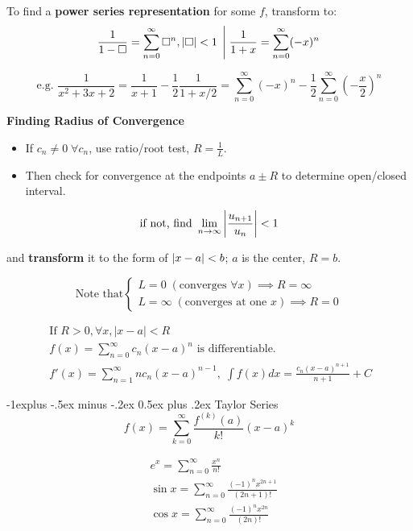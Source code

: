 \documentclass[10pt]{article}
\makeatletter
\renewcommand{\subsection}{\@startsection{subsection}{2}{0mm}%
                                {-1explus -.5ex minus -.2ex}%
                                {0.5ex plus .2ex}%
                                {\normalfont\normalsize\bfseries}}
\makeatother
\begin{document}
\begin{multicols}{2}
To find a \textbf{power series representation} for some $f$, transform to:
\[\frac{1}{1-\Box} = \sum_{n = 0 }^{\infty} \Box^n, \abs{\Box} < 1 \; \left\vert \; \frac{1}{1+x} = \sum_{n = 0 }^{\infty}(-x)^n \right. \]

\[\text{e.g. } \frac{1}{x^2+3x+2} = \frac{1}{x+1}-\frac{1}{2}\frac{1}{1+x/2} = 
\sum_{n = 0 }^{\infty}(-x)^n - \frac{1}{2} \sum_{n = 0 }^{\infty}(-\frac{x}{2})^n\]

\textbf{Finding Radius of Convergence} \\
\begin{itemize}
    \item If $c_n \neq 0 \; \forall c_n$, use ratio/root test, $R = \frac{1}{L}$.
    \item Then check for convergence at the endpoints $a\pm R$ to determine open/closed interval.
\end{itemize}

\[\text{if not, find }\lim_{n\to\infty} \abs{\frac{u_{n+1}}{u_n}} < 1\]

and \textbf{transform} it to the form of $\abs{x-a} < b$; $a$ is the center, $R = b$.

\[\text{Note that} \begin{cases}
    L = 0 \; (\text{converges } \forall x) \implies R = \infty \\
    L = \infty \; (\text{converges at one } x) \implies R = 0
\end{cases}\]

\begin{align*}
    & \text{If } R > 0, \forall x, |x-a| < R \\
    & f(x) = \sum_{n=0}^{\infty} c_n(x-a)^n \text{ is differentiable.} \\
    & f'(x) = \sum_{n=1}^{\infty} nc_n(x-a)^{n-1}, \; \int f(x)dx = \frac{c_n(x-a)^{n+1}}{n+1} + C \; \;
\end{align*}



\subsection{Taylor Series}
\[f(x) = \sum_{k=0}^{\infty} \frac{f^{(k)}(a)}{k!} (x-a)^k\]
\begin{multicols*}{2}
    \begin{align*}
       & e^x = \sum_{n=0}^{\infty} \frac{x^n}{n!} \\
       & \sin x = \sum_{n=0}^{\infty} \frac{(-1)^n x ^{2n+1}}{(2n+1)!} \\
       & \cos x = \sum_{n=0}^{\infty} \frac{(-1)^n x ^{2n}}{(2n)!}
    \end{align*}
        

\end{multicols*}
\end{multicols}
\end{document}
